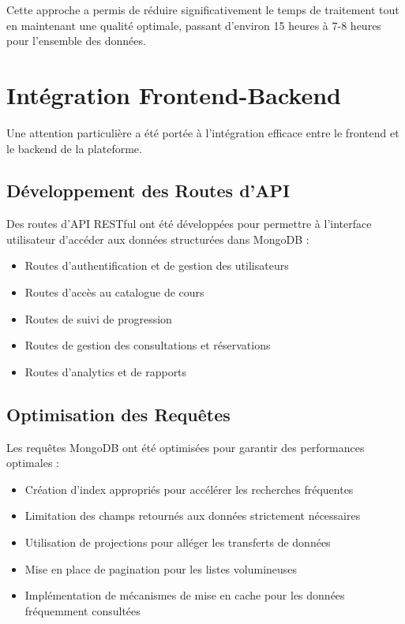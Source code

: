 Cette approche a permis de réduire significativement le temps de traitement tout en maintenant une qualité optimale, passant d'environ 15 heures à 7-8 heures pour l'ensemble des données.

\section{Intégration Frontend-Backend}

Une attention particulière a été portée à l'intégration efficace entre le frontend et le backend de la plateforme.

\subsection{Développement des Routes d'API}

Des routes d'API RESTful ont été développées pour permettre à l'interface utilisateur d'accéder aux données structurées dans MongoDB :

\begin{itemize}
  \item Routes d'authentification et de gestion des utilisateurs
  \item Routes d'accès au catalogue de cours
  \item Routes de suivi de progression
  \item Routes de gestion des consultations et réservations
  \item Routes d'analytics et de rapports
\end{itemize}

\subsection{Optimisation des Requêtes}

Les requêtes MongoDB ont été optimisées pour garantir des performances optimales :

\begin{itemize}
  \item Création d'index appropriés pour accélérer les recherches fréquentes
  \item Limitation des champs retournés aux données strictement nécessaires
  \item Utilisation de projections pour alléger les transferts de données
  \item Mise en place de pagination pour les listes volumineuses
  \item Implémentation de mécanismes de mise en cache pour les données fréquemment consultées
\end{itemize}

